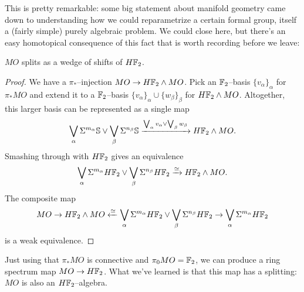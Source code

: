 This is pretty remarkable: some big statement about manifold geometry came down to understanding how we could reparametrize a certain formal group, itself a (fairly simple) purely algebraic problem.  We could close here, but there's an easy homotopical consequence of this fact that is worth recording before we leave:

\begin{lemma}
$MO$ splits as a wedge of shifts of $H\mathbb F_2$.
\end{lemma}
\begin{proof}
We have a $\pi_*$--injection $MO \to H\mathbb F_2 \wedge MO$.  Pick an $\mathbb F_2$--basis $\{v_\alpha\}_\alpha$ for $\pi_* MO$ and extend it to a $\mathbb F_2$--basis $\{v_\alpha\}_\alpha \cup \{w_\beta\}_\beta$ for $H\mathbb F_2 \wedge MO$.  Altogether, this larger basis can be represented as a single map \[\bigvee_\alpha \Sigma^{m_\alpha} \mathbb S \vee \bigvee_\beta \Sigma^{n_\beta} \mathbb S \xrightarrow{\bigvee_\alpha v_\alpha \vee \bigvee_\beta w_\beta} H\mathbb F_2 \wedge MO.\]  Smashing through with $H\mathbb F_2$ gives an equivalence \[\bigvee_\alpha \Sigma^{m_\alpha} H\mathbb F_2 \vee \bigvee_\beta \Sigma^{n_\beta} H\mathbb F_2 \xrightarrow\simeq H\mathbb F_2 \wedge MO.\]  The composite map \[MO \to H\mathbb F_2 \wedge MO \xleftarrow\simeq \bigvee_\alpha \Sigma^{m_\alpha} H\mathbb F_2 \vee \bigvee_\beta \Sigma^{n_\beta} H\mathbb F_2 \to \bigvee_\alpha \Sigma^{m_\alpha} H\mathbb F_2\] is a weak equivalence.
\end{proof}

\begin{remark}
Just using that $\pi_* MO$ is connective and $\pi_0 MO = \mathbb F_2$, we can produce a ring spectrum map $MO \to H\mathbb F_2$.  What we've learned is that this map has a splitting: $MO$ is also an $H\mathbb F_2$--algebra.
\end{remark}



